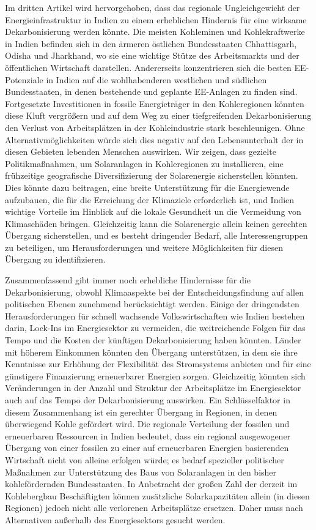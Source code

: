 \documentclass[../thesis.tex]{subfiles}
\begin{document}
Im dritten Artikel wird hervorgehoben, dass das regionale Ungleichgewicht der Energieinfrastruktur in Indien zu einem erheblichen Hindernis für eine wirksame Dekarbonisierung werden könnte. Die meisten Kohleminen und Kohlekraftwerke in Indien befinden sich in den ärmeren östlichen Bundesstaaten Chhattisgarh, Odisha und Jharkhand, wo sie eine wichtige Stütze des Arbeitsmarkts und der öffentlichen Wirtschaft darstellen. Andererseits konzentrieren sich die besten EE-Potenziale in Indien auf die wohlhabenderen westlichen und südlichen Bundesstaaten, in denen bestehende und geplante EE-Anlagen zu finden sind.  Fortgesetzte Investitionen in fossile Energieträger in den Kohleregionen könnten diese Kluft vergrö\ss ern und auf dem Weg zu einer tiefgreifenden Dekarbonisierung den Verlust von Arbeitsplätzen in der Kohleindustrie stark beschleunigen. Ohne Alternativmöglichkeiten würde sich dies negativ auf den Lebensunterhalt der in diesen Gebieten lebenden Menschen auswirken. Wir zeigen, dass gezielte Politikma\ss nahmen, um Solaranlagen in Kohleregionen zu installieren, eine frühzeitige geografische Diversifizierung der Solarenergie sicherstellen könnten. Dies könnte dazu beitragen, eine breite Unterstützung für die Energiewende aufzubauen, die für die Erreichung der Klimaziele erforderlich ist, und Indien wichtige Vorteile im Hinblick auf die lokale Gesundheit un die Vermeidung von Klimaschäden bringen. Gleichzeitig kann die Solarenergie allein keinen gerechten Übergang sicherstellen, und es besteht dringender Bedarf, alle Interessengruppen zu beteiligen, um Herausforderungen und weitere Möglichkeiten für diesen Übergang zu identifizieren.

Zusammenfassend gibt immer noch erhebliche Hindernisse für die Dekarbonisierung, obwohl Klimaaspekte bei der Entscheidungsfindung auf allen politischen Ebenen zunehmend berücksichtigt werden. Einige der dringendsten Herausforderungen für schnell wachsende Volkswirtschaften wie Indien bestehen darin, Lock-Ins im Energiesektor zu vermeiden, die weitreichende Folgen für das Tempo und die Kosten der künftigen Dekarbonisierung haben könnten. Länder mit höherem Einkommen könnten den Übergang unterstützen, in dem sie ihre Kenntnisse zur Erhöhung der Flexibilität des Stromsystems anbieten und für eine günstigere Finanzierung erneuerbarer Energien sorgen. Gleichzeitig könnten sich Veränderungen in der Anzahl und Struktur der Arbeitsplätze im Energiesektor auch auf das Tempo der Dekarbonisierung auswirken. Ein Schlüsselfaktor in diesem Zusammenhang ist ein gerechter Übergang in Regionen, in denen überwiegend Kohle gefördert wird. Die regionale Verteilung der fossilen und erneuerbaren Ressourcen in Indien bedeutet, dass ein regional ausgewogener Übergang von einer fossilen zu einer auf erneuerbaren Energien basierenden Wirtschaft nicht von alleine erfolgen würde; es bedarf spezieller politischer Ma\ss nahmen zur Unterstützung des Baus von Solaranlagen in den bisher kohlefördernden Bundesstaaten. In Anbetracht der gro\ss en Zahl der derzeit im Kohlebergbau Beschäftigten können zusätzliche Solarkapazitäten allein (in diesen Regionen) jedoch nicht alle verlorenen Arbeitsplätze ersetzen. Daher muss nach Alternativen au\ss erhalb des Energiesektors gesucht werden. 
\end{document}
